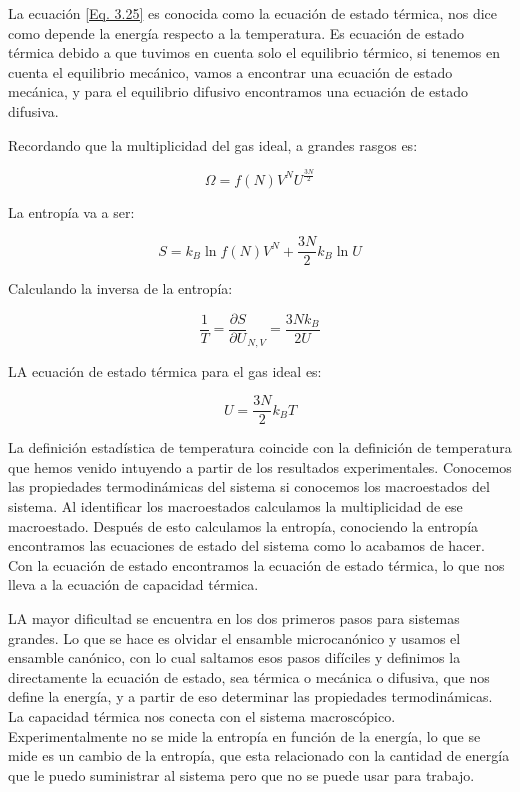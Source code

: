 \documentclass[11pt,fleqn]{book}
\begin{document}
La ecuación \ref{Eq. 3.25} es conocida como la ecuación de estado térmica, nos dice como depende la energía respecto a la temperatura. Es ecuación de estado térmica debido a que tuvimos en cuenta solo el equilibrio térmico, si tenemos en cuenta el equilibrio mecánico, vamos a encontrar una ecuación de estado mecánica, y para el equilibrio difusivo encontramos una ecuación de estado difusiva. 

\begin{example}
Recordando que la multiplicidad del gas ideal, a grandes rasgos es:

\begin{equation*}
    \Omega=f(N)V^{N}U^{\frac{3N}{2}}
\end{equation*}

La entropía va a ser:

\begin{equation*}
    S=k_{B}\ln{f(N)V^{N}}+\frac{3N}{2}k_{B}\ln{U}
\end{equation*}

Calculando la inversa de la entropía:

\begin{equation*}
     \frac{1}{T}=\frac{\partial S}{\partial U}_{N,V}=\frac{3Nk_{B}}{2U}
\end{equation*}

LA ecuación de estado térmica para el gas ideal es:

\begin{equation}
    U=\frac{3N}{2}k_{B}T
    \label{Eq. 3.26}
\end{equation}
\end{example}

La definición estadística de temperatura coincide con la definición de temperatura que hemos venido intuyendo a partir de los resultados experimentales. Conocemos las propiedades termodinámicas del sistema si conocemos los macroestados del sistema. Al identificar los macroestados calculamos la multiplicidad de ese macroestado. Después de esto calculamos la entropía, conociendo la entropía encontramos las ecuaciones de estado del sistema como lo acabamos de hacer. Con la ecuación de estado encontramos la ecuación de estado térmica, lo que nos lleva a la ecuación de capacidad térmica.

LA mayor dificultad se encuentra en los dos primeros pasos para sistemas grandes. Lo que se hace es olvidar el ensamble microcanónico y usamos el ensamble canónico, con lo cual saltamos esos pasos difíciles y definimos la directamente la ecuación de estado, sea térmica o mecánica o difusiva, que nos define la energía, y a partir de eso determinar las propiedades termodinámicas.  La capacidad térmica nos conecta con el sistema macroscópico. Experimentalmente no se mide la entropía en función de la energía, lo que se mide es un cambio de la entropía, que esta relacionado con la cantidad de energía que le puedo suministrar al sistema pero que no se puede usar para trabajo.
\end{document}
